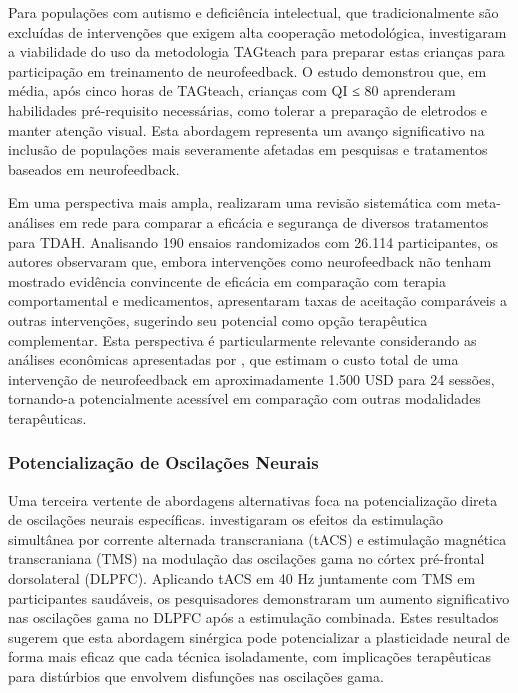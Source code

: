 Para populações com autismo e deficiência intelectual, que tradicionalmente são excluídas de intervenções que exigem alta cooperação metodológica,  investigaram a viabilidade do uso da metodologia TAGteach para preparar estas crianças para participação em treinamento de neurofeedback. O estudo demonstrou que, em média, após cinco horas de TAGteach, crianças com QI ≤ 80 aprenderam habilidades pré-requisito necessárias, como tolerar a preparação de eletrodos e manter atenção visual. Esta abordagem representa um avanço significativo na inclusão de populações mais severamente afetadas em pesquisas e tratamentos baseados em neurofeedback.

Em uma perspectiva mais ampla,  realizaram uma revisão sistemática com meta-análises em rede para comparar a eficácia e segurança de diversos tratamentos para TDAH. Analisando 190 ensaios randomizados com 26.114 participantes, os autores observaram que, embora intervenções como neurofeedback não tenham mostrado evidência convincente de eficácia em comparação com terapia comportamental e medicamentos, apresentaram taxas de aceitação comparáveis a outras intervenções, sugerindo seu potencial como opção terapêutica complementar. Esta perspectiva é particularmente relevante considerando as análises econômicas apresentadas por , que estimam o custo total de uma intervenção de neurofeedback em aproximadamente 1.500 USD para 24 sessões, tornando-a potencialmente acessível em comparação com outras modalidades terapêuticas.

\subsubsection{Potencialização de Oscilações Neurais}
Uma terceira vertente de abordagens alternativas foca na potencialização direta de oscilações neurais específicas.  investigaram os efeitos da estimulação simultânea por corrente alternada transcraniana (tACS) e estimulação magnética transcraniana (TMS) na modulação das oscilações gama no córtex pré-frontal dorsolateral (DLPFC). Aplicando tACS em 40 Hz juntamente com TMS em participantes saudáveis, os pesquisadores demonstraram um aumento significativo nas oscilações gama no DLPFC após a estimulação combinada. Estes resultados sugerem que esta abordagem sinérgica pode potencializar a plasticidade neural de forma mais eficaz que cada técnica isoladamente, com implicações terapêuticas para distúrbios que envolvem disfunções nas oscilações gama.


